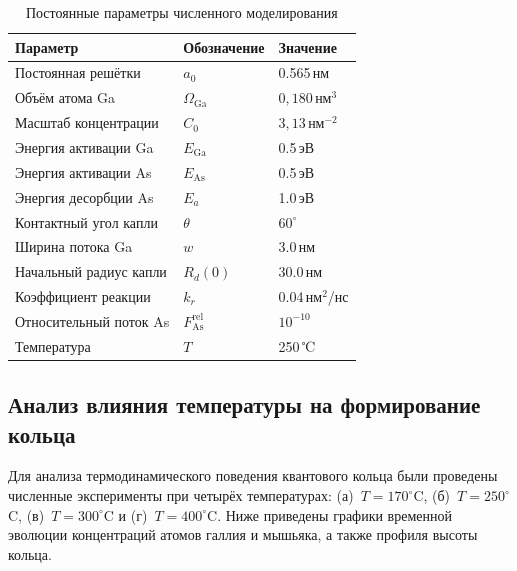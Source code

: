 \documentclass[14pt,oneside]{extarticle}
\begin{document}
\begin{table}[H]
    \centering
    \caption{Постоянные параметры численного моделирования}
    \label{tab:params-fixed}
    \begin{tabular}{|l|l|l|}
    \hline
    \textbf{Параметр} & \textbf{Обозначение} & \textbf{Значение} \\ \hline
    Постоянная решётки & $a_0$ & 0.565\,нм \\ \hline
    Объём атома Ga & $\Omega_{\text{Ga}}$ &  $0{,}180\,\text{нм}^3$ \\ \hline
    Масштаб концентрации & $C_0$ & $ 3{,}13\,\text{нм}^{-2}$ \\ \hline
    Энергия активации Ga & $E_{\text{Ga}}$ & 0.5\,эВ \\ \hline
    Энергия активации As & $E_{\text{As}}$ & 0.5\,эВ \\ \hline
    Энергия десорбции As & $E_a$ & 1.0\,эВ \\ \hline
    Контактный угол капли & $\theta$ & $60^\circ$ \\ \hline
    Ширина потока Ga & $w$ & 3.0\,нм \\ \hline
    Начальный радиус капли & $R_d(0)$ & 30.0\,нм \\ \hline
    Коэффициент реакции & $k_r$ & 0.04\,нм$^2$/нс \\ \hline
    Относительный поток As & $F_{\text{As}}^{\text{rel}}$ & $10^{-10}$ \\ \hline
    Температура & $T$ & 250\,℃ \\ \hline
    \end{tabular}
\end{table}    

\subsection{Анализ влияния температуры на формирование кольца}

Для анализа термодинамического поведения квантового кольца были проведены численные эксперименты при четырёх температурах: (а)~$T = 170^\circ$C, (б)~$T = 250^\circ$C, (в)~$T = 300^\circ$C и (г)~$T = 400^\circ$C. Ниже приведены графики временной эволюции концентраций атомов галлия и мышьяка, а также профиля высоты кольца.    
\end{document}
